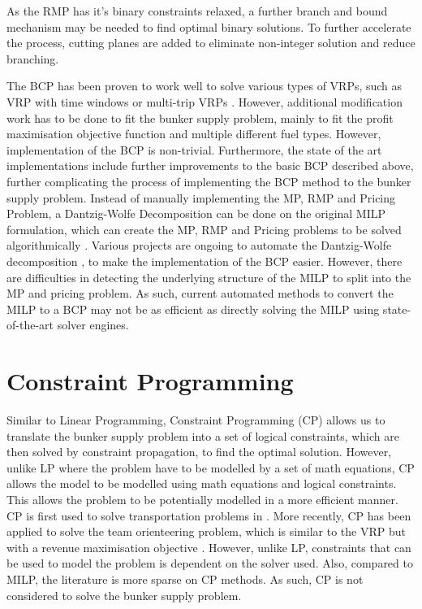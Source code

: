 As the RMP has it's binary constraints relaxed, a further branch and bound mechanism may be needed to find optimal binary solutions. To further accelerate the process, cutting planes are added to eliminate non-integer solution and reduce branching.

The BCP has been proven to work well to solve various types of VRPs, such as VRP with time windows \cite{lodi_generic_2019} or multi-trip VRPs \cite{hernandez_branch-and-price_2016}. However, additional modification work has to be done to fit the bunker supply problem, mainly to fit the profit maximisation objective function and multiple different fuel types. However, implementation of the BCP is non-trivial. Furthermore, the state of the art implementations include further improvements to the basic BCP described above, further complicating the process of implementing the BCP method to the bunker supply problem. Instead of manually implementing the MP, RMP and Pricing Problem, a Dantzig-Wolfe Decomposition can be done on the original MILP formulation, which can create the MP, RMP and Pricing problems to be solved algorithmically \cite{dantzig_decomposition_1960}. Various projects are ongoing to automate the Dantzig-Wolfe decomposition \cite{hutchison_experiments_2010}, to make the implementation of the BCP easier. However, there are difficulties in detecting the underlying structure of the MILP to split into the MP and pricing problem. As such, current automated methods to convert the MILP to a BCP may not be as efficient as directly solving the MILP using state-of-the-art solver engines. 

\section{Constraint Programming}
Similar to Linear Programming, Constraint Programming (CP) allows us to translate the bunker supply problem into a set of logical constraints, which are then solved by constraint propagation, to find the optimal solution. However, unlike LP where the problem have to be modelled by a set of math equations, CP allows the model to be modelled using math equations and logical constraints. This allows the problem to be potentially modelled in a more efficient manner. CP is first used to solve transportation problems in \cite{puget_object_1993}. More recently, CP has been applied to solve the team orienteering problem, which is similar to the VRP but with a revenue maximisation objective \cite{gedik_constraint_2017}. However, unlike LP, constraints that can be used to model the problem is dependent on the solver used. Also, compared to MILP, the literature is more sparse on CP methods. As such, CP is not considered to solve the bunker supply problem.

